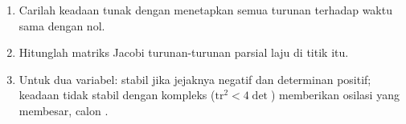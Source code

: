 \begin{method}\label{met:b3:complex-kinetics:stability}
\begin{enumerate}
  \item Carilah keadaan tunak dengan menetapkan semua turunan terhadap waktu
        sama dengan nol.
  \item Hitunglah matriks Jacobi turunan-turunan parsial laju di titik itu.
  \item Untuk dua variabel: stabil jika jejaknya negatif dan determinan positif;
        keadaan tidak stabil dengan  kompleks
        ($\mathrm{tr}^2 < 4\det$) memberikan osilasi yang membesar, calon
        .
\end{enumerate}
\end{method}

